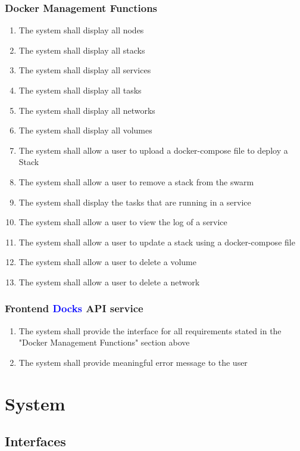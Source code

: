 \documentclass[]{article}
\newcommand{\docks}{\textcolor{Blue}{Docks} }
\begin{document}
\subsubsection{Docker Management Functions}
\begin{enumerate}[label*=R5.\arabic*.]
	\item The system shall display all nodes
	\item The system shall display all stacks
	\item The system shall display all services
	\item The system shall display all tasks
	\item The system shall display all networks
	\item The system shall display all volumes
	\item The system shall allow a user to upload a docker-compose file to deploy a Stack
	\item The system shall allow a user to remove a stack from the swarm
	\item The system shall display the tasks that are running in a service
	\item The system shall allow a user to view the log of a service
	\item The system shall allow a user to update a stack using a docker-compose file
	\item The system shall allow a user to delete a volume
	\item The system shall allow a user to delete a network
\end{enumerate}

\subsubsection{Frontend \docks API service}
\begin{enumerate}[label*=R6.\arabic*.]
	\item The system shall provide the interface for all requirements stated in the "Docker Management Functions" section above
	\item The system shall provide meaningful error message to the user
\end{enumerate}

\section{System}
\subsection{Interfaces}
\end{document}
